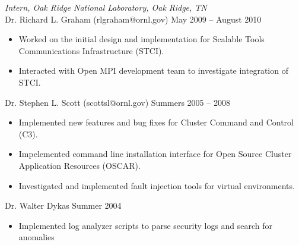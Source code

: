 {\sl Intern, Oak Ridge National Laboratory, Oak Ridge, TN} \\
Dr. Richard L. Graham (rlgraham@ornl.gov) \hfill May 2009 -- August 2010 
\begin{itemize} \itemsep -2pt %
        \item Worked on the initial design and implementation for Scalable
            Tools Communications Infrastructure (STCI).
        \item Interacted with Open MPI development team to investigate
            integration of STCI.
\end{itemize} 
Dr. Stephen L. Scott (scottsl@ornl.gov) \hfill Summers 2005 -- 2008
\begin{itemize} \itemsep -2pt
        \item Implemented new features and bug fixes for Cluster Command and
            Control (C3).
        \item Impelemented command line installation interface for Open Source
            Cluster Application Resources (OSCAR).
        \item Investigated and implemented fault injection tools for virtual
            environments.
\end{itemize}
Dr. Walter Dykas \hfill Summer 2004
\begin{itemize} \itemsep -2pt
        \item Implemented log analyzer scripts to parse security logs and
            search for anomalies
\end{itemize}
%

